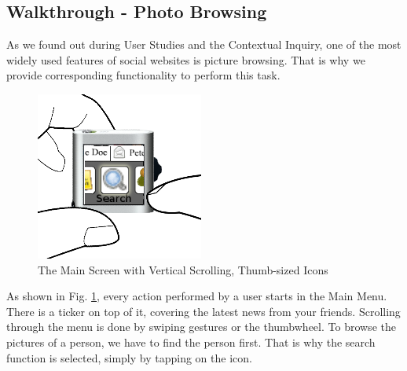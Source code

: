 %
%
% 
%
\clearpage
\subsection{Walkthrough - Photo Browsing}
%
As we found out during User Studies and the Contextual Inquiry, one of the most widely used features of social websites is picture browsing.
That is why we provide corresponding functionality to perform this task.

\begin{figure}[h]
  \begin{center}
    \includegraphics[width=0.6\linewidth]{imgs/wt1.png}
  \end{center}
  \caption{The Main Screen with Vertical Scrolling, Thumb-sized Icons}
  \label{fig:wt1}
\end{figure}
%
As shown in Fig. \ref{fig:wt1}, every action performed by a user starts in the Main Menu. There is a ticker on top of it, covering the latest news from your friends. Scrolling through the menu is done by swiping gestures or the thumbwheel.
To browse the pictures of a person, we have to find the person first. That is why the search function is selected, simply by tapping on the icon.

